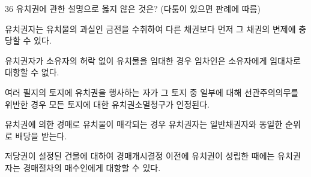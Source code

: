 \begin{question}{36}
유치권에 관한 설명으로 옳지 않은 것은? (다툼이 있으면 판례에 따름)
\begin{choices}
  \item 유치권자는 유치물의 과실인 금전을 수취하여 다른 채권보다 먼저 그 채권의 변제에 충당할 수 있다.
  \item 유치권자가 소유자의 허락 없이 유치물을 임대한 경우 임차인은 소유자에게 임대차로 대항할 수 없다.
  \item 여러 필지의 토지에 유치권을 행사하는 자가 그 토지 중 일부에 대해 선관주의의무를 위반한 경우 모든 토지에 대한 유치권소멸청구가 인정된다.
  \item 유치권에 의한 경매로 유치물이 매각되는 경우 유치권자는 일반채권자와 동일한 순위로 배당을 받는다.
  \item 저당권이 설정된 건물에 대하여 경매개시결정 이전에 유치권이 성립한 때에는 유치권자는 경매절차의 매수인에게 대항할 수 있다.
\end{choices}
\end{question}
